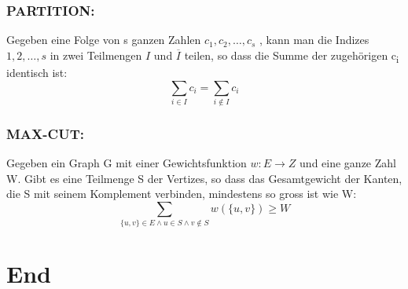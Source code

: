 \documentclass[11pt,twoside,landscape]{article}
\begin{document}
\begin{multicols}{3}
\subsubsection*{PARTITION:}
\label{sec:org298dae0}
Gegeben eine Folge von s ganzen Zahlen \(c_1 , c_2 , \dots, c_s\) , kann man die Indizes \(1, 2, \dots , s\) in zwei Teilmengen \(I\) und \(\overline{I}\) teilen, so dass die Summe der zugehörigen c\textsubscript{i}
identisch ist:
$$
\sum_{i \in I} c_i = \sum_{i \notin I} c_i
$$

\subsubsection*{MAX-CUT:}
\label{sec:orgfc31a1c}
Gegeben ein Graph G mit einer Gewichtsfunktion \(w : E \rightarrow Z\) und eine ganze Zahl W. Gibt es eine Teilmenge S der Vertizes, so dass das Gesamtgewicht der Kanten, die S mit seinem Komplement verbinden, mindestens so gross ist wie W:
$$
\sum_{\{u,v\}\in E\wedge u\in S\wedge v\not\in S} w(\{u,v\})\ge W
$$

\section*{End}
\label{sec:orgd3c66fd}
\end{multicols}
\end{document}
